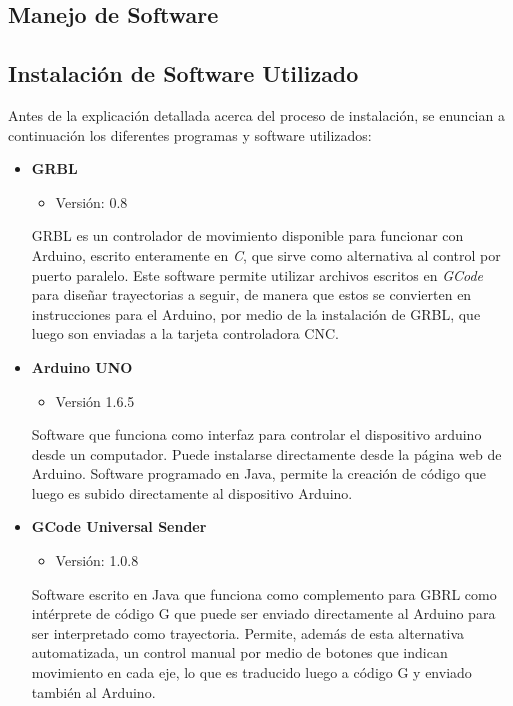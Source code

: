 \documentclass{article}
\begin{document}
\begin{multicols}{2}
{\centering \section{Manejo de Software}}
{\centering \subsection{Instalación de Software Utilizado}}
Antes de la explicación detallada acerca del proceso de instalación, se enuncian a continuación los diferentes programas y software utilizados:
\begin{itemize}
\item \textbf{GRBL}\\
\begin{itemize}
\item Versión: 0.8
\end{itemize}
GRBL es un controlador de movimiento disponible para funcionar con Arduino, escrito enteramente en \textit{C}, que sirve como alternativa al control por puerto paralelo. Este software permite utilizar archivos escritos en \textit{GCode} para diseñar trayectorias a seguir, de manera que estos se convierten en instrucciones para el Arduino, por medio de la instalación de GRBL, que luego son enviadas a la tarjeta controladora CNC.

\item \textbf{Arduino UNO}\\
\begin{itemize}
\item Versión 1.6.5
\end{itemize}
Software que funciona como interfaz para controlar el dispositivo arduino desde un computador. Puede instalarse directamente desde la página web de Arduino. Software programado en Java, permite la creación de código que luego es subido directamente al dispositivo Arduino.

\item \textbf{GCode Universal Sender}\\
\begin{itemize}
\item Versión: 1.0.8
\end{itemize}
Software escrito en Java que funciona como complemento para GBRL como intérprete de código G que puede ser enviado directamente al Arduino para ser interpretado como trayectoria. Permite, además de esta alternativa automatizada, un control manual por medio de botones que indican movimiento en cada eje, lo que es traducido luego a código G y enviado también al Arduino.


\end{itemize}
\end{multicols}
\end{document}
